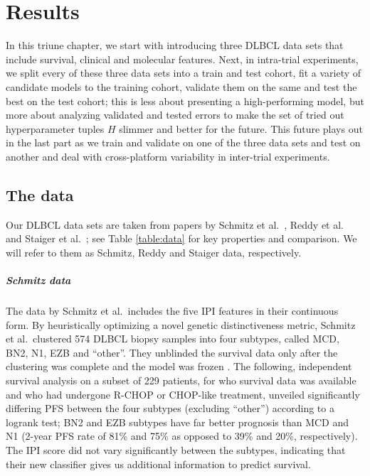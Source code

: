 \chapter{Results} \label{chap:results}

In this triune chapter, we start with introducing three DLBCL data sets that include 
survival, clinical and molecular features. Next, in intra-trial experiments, we split every of these 
three data sets into 
a train and test cohort, fit a variety of candidate models to the training 
cohort, validate them on the same and test the best on the test cohort; this is less about presenting a 
high-performing model, but more about analyzing validated and tested errors to make the set of tried 
out hyperparameter tuples $H$ slimmer and 
better for the future. This future plays out in the last part as we train and validate on one of 
the three data sets and test on another and deal with cross-platform variability in inter-trial 
experiments.

\section{The data}\label{sec:data}

Our DLBCL data sets are taken from papers by Schmitz et al.\ \cite{schmitz18}, Reddy et al.\ 
\cite{reddy17} and Staiger et al.\ \cite{staiger20}; see Table \ref{table:data} for key properties 
and comparison. We will refer to them as Schmitz, Reddy and Staiger data, respectively.



\paragraph{Schmitz data}
The data by Schmitz et al.\ includes the five IPI features in their continuous form. 
By heuristically optimizing a novel genetic distinctiveness metric, Schmitz et al.\ 
clustered \num{574} DLBCL biopsy samples into four subtypes, called MCD, BN2, N1, EZB and ``other''. They 
unblinded the survival data only after the clustering was complete and the 
model was frozen \cite[Appendix 1, pp. 16--18]{schmitz18}. The following, independent survival analysis 
on a subset of \num{229} patients, for who survival data was available and who had undergone R-CHOP 
or CHOP-like treatment, unveiled significantly differing PFS between the four subtypes (excluding 
``other'') according to a logrank test; BN2 and EZB subtypes have far better prognosis than MCD and 
N1 (2-year PFS rate of \num{81}\% and \num{75}\% as opposed to \num{39}\% and 
\num{20}\%, respectively). The IPI score did not vary significantly between the subtypes, 
indicating that their new classifier gives us additional information to predict survival.


